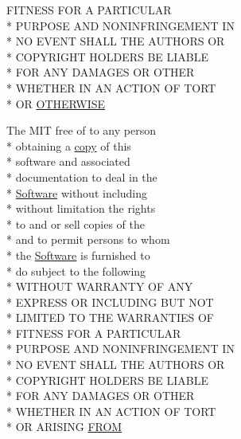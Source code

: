 \begin{DoxyCompactItemize}
F\-I\-T\-N\-E\-S\-S F\-O\-R A P\-A\-R\-T\-I\-C\-U\-L\-A\-R \\*
P\-U\-R\-P\-O\-S\-E A\-N\-D N\-O\-N\-I\-N\-F\-R\-I\-N\-G\-E\-M\-E\-N\-T I\-N \\*
N\-O E\-V\-E\-N\-T S\-H\-A\-L\-L T\-H\-E A\-U\-T\-H\-O\-R\-S O\-R \\*
C\-O\-P\-Y\-R\-I\-G\-H\-T H\-O\-L\-D\-E\-R\-S B\-E L\-I\-A\-B\-L\-E \\*
F\-O\-R A\-N\-Y D\-A\-M\-A\-G\-E\-S O\-R O\-T\-H\-E\-R \\*
W\-H\-E\-T\-H\-E\-R I\-N A\-N A\-C\-T\-I\-O\-N O\-F T\-O\-R\-T \\*
O\-R \hyperlink{LICENSE_8txt_ae4c7c54aef6c135b4520f2237dbcf7c6}{O\-T\-H\-E\-R\-W\-I\-S\-E}
\item 
The M\-I\-T free of to any person \\*
obtaining a \hyperlink{LICENSE_8txt_aff1d4c6b756ebf691fa44a0904f68658}{copy} of this \\*
software and associated \\*
documentation to deal in the \\*
\hyperlink{LICENSE_8txt_a22a1529885b3e9d66b0c72fe604fc3dc}{Software} without including \\*
without limitation the rights \\*
to and or sell copies of the \\*
and to permit persons to whom \\*
the \hyperlink{LICENSE_8txt_a22a1529885b3e9d66b0c72fe604fc3dc}{Software} is furnished to \\*
do subject to the following \\*
W\-I\-T\-H\-O\-U\-T W\-A\-R\-R\-A\-N\-T\-Y O\-F A\-N\-Y \\*
E\-X\-P\-R\-E\-S\-S O\-R I\-N\-C\-L\-U\-D\-I\-N\-G B\-U\-T N\-O\-T \\*
L\-I\-M\-I\-T\-E\-D T\-O T\-H\-E W\-A\-R\-R\-A\-N\-T\-I\-E\-S O\-F \\*
F\-I\-T\-N\-E\-S\-S F\-O\-R A P\-A\-R\-T\-I\-C\-U\-L\-A\-R \\*
P\-U\-R\-P\-O\-S\-E A\-N\-D N\-O\-N\-I\-N\-F\-R\-I\-N\-G\-E\-M\-E\-N\-T I\-N \\*
N\-O E\-V\-E\-N\-T S\-H\-A\-L\-L T\-H\-E A\-U\-T\-H\-O\-R\-S O\-R \\*
C\-O\-P\-Y\-R\-I\-G\-H\-T H\-O\-L\-D\-E\-R\-S B\-E L\-I\-A\-B\-L\-E \\*
F\-O\-R A\-N\-Y D\-A\-M\-A\-G\-E\-S O\-R O\-T\-H\-E\-R \\*
W\-H\-E\-T\-H\-E\-R I\-N A\-N A\-C\-T\-I\-O\-N O\-F T\-O\-R\-T \\*
O\-R A\-R\-I\-S\-I\-N\-G \hyperlink{LICENSE_8txt_ac44d0f7742875ad0d1fc3a6de1ee0f7d}{F\-R\-O\-M}
\end{DoxyCompactItemize}


